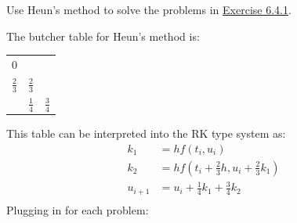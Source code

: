 \documentclass[11pt]{article}
\newenvironment{problem}[2][Question]{\begin{trivlist}
\item[\hskip \labelsep {\bfseries #1}\hskip \labelsep {\bfseries #2.}]}{\end{trivlist}}
\theoremstyle{definition}
\begin{document}
\begin{problem}{6.4.4}
Use Heun's method to solve the problems in \href{https://fncbook.com/rk/#problem-rk-byhand}{Exercise 6.4.1}.
\end{problem}
The butcher table for Heun's method is:
\begin{center}
    \begin{tabular}{c|cc}
    0 & & \\
    $\frac{2}{3}$ & $\frac{2}{3}$ & \\\hline
    & $\frac{1}{4}$ & $\frac{3}{4}$
    \end{tabular}
\end{center}
This table can be interpreted into the RK type system as:
\begin{align*}
    k_1 &= h f(t_i, u_i) \\
    k_2 &= h f(t_i + \frac{2}{3}h, u_i + \frac{2}{3}k_1) \\
    u_{i+1} &= u_i + \frac{1}{4}k_1 + \frac{3}{4}k_2 \\
\end{align*}
Plugging in for each problem:
\end{document}
